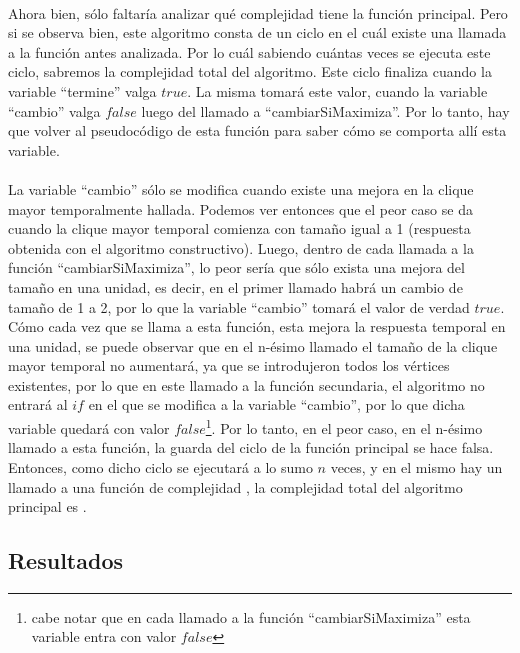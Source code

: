 \paragraph{}
Ahora bien, sólo faltaría analizar qué complejidad tiene la función principal. Pero si se observa bien, este algoritmo consta de un ciclo en el cuál existe una llamada a la función antes analizada. Por lo cuál sabiendo cuántas veces se ejecuta este ciclo, sabremos la complejidad total del algoritmo. Este ciclo finaliza cuando la variable ``termine'' valga $true$. La misma tomará este valor, cuando la variable ``cambio'' valga $false$ luego del llamado a ``cambiarSiMaximiza''. Por lo tanto, hay que volver al pseudocódigo de esta función para saber cómo se comporta allí esta variable.

\paragraph{}
La variable ``cambio'' sólo se modifica cuando existe una mejora en la clique mayor temporalmente hallada. Podemos ver entonces que el peor caso se da cuando la clique mayor temporal comienza con tamaño igual a 1 (respuesta obtenida con el algoritmo constructivo). Luego, dentro de cada llamada a la función ``cambiarSiMaximiza'', lo peor sería que sólo exista una mejora del tamaño en una unidad, es decir, en el primer llamado habrá un cambio de tamaño de 1 a 2, por lo que la variable ``cambio'' tomará el valor de verdad $true$. Cómo cada vez que se llama a esta función, esta mejora la respuesta temporal en una unidad, se puede observar que en el n-ésimo llamado el tamaño de la clique mayor temporal no aumentará, ya que se introdujeron todos los vértices existentes, por lo que en este llamado a la función secundaria, el algoritmo no entrará al $if$ en el que se modifica a la variable ``cambio'', por lo que dicha variable quedará con valor $false$\footnote{cabe notar que en cada llamado a la función ``cambiarSiMaximiza'' esta variable entra con valor $false$}. Por lo tanto, en el peor caso, en el n-ésimo llamado a esta función, la guarda del ciclo de la función principal se hace falsa. Entonces, como dicho ciclo se ejecutará a lo sumo $n$ veces, y en el mismo hay un llamado a una función de complejidad , la complejidad total del algoritmo principal es .



\subsection{Resultados}

